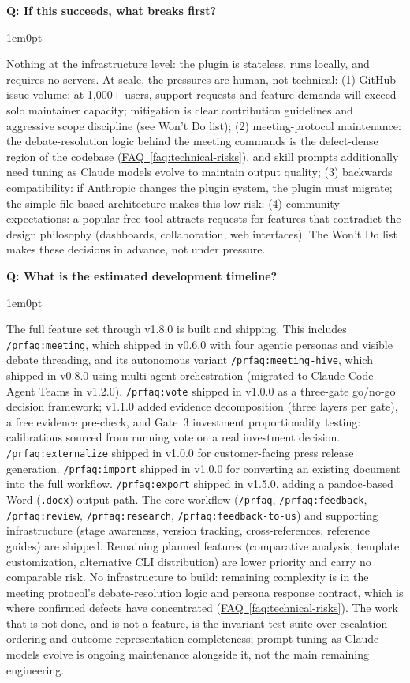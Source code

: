 \documentclass[11pt,letterpaper]{article}
\newcounter{faqnum}
\newenvironment{faqpair}[1]{%
  \needspace{4\baselineskip}%
  \vspace{0.5em}%
  \refstepcounter{faqnum}%
  \noindent\textbf{\color{SectionBlue}Q\thefaqnum: #1}\par\nopagebreak[4]%
  \vspace{0.2em}%
  \begin{adjustwidth}{1em}{0pt}%
  \setlength{\parindent}{0pt}%
}{%
  \end{adjustwidth}%
  \vspace{0.5em}%
}
\newcommand{\faqref}[1]{\hyperref[#1]{FAQ~\ref*{#1}}}
\begin{document}
\begin{faqpair}{If this succeeds, what breaks first?}
  Nothing at the infrastructure level: the plugin is stateless, runs locally, and requires no servers. At scale, the pressures are human, not technical: (1) GitHub issue volume: at 1,000+ users, support requests and feature demands will exceed solo maintainer capacity; mitigation is clear contribution guidelines and aggressive scope discipline (see Won't Do list); (2) meeting-protocol maintenance: the debate-resolution logic behind the meeting commands is the defect-dense region of the codebase (\faqref{faq:technical-risks}), and skill prompts additionally need tuning as Claude models evolve to maintain output quality; (3) backwards compatibility: if Anthropic changes the plugin system, the plugin must migrate; the simple file-based architecture makes this low-risk; (4) community expectations: a popular free tool attracts requests for features that contradict the design philosophy (dashboards, collaboration, web interfaces). The Won't Do list makes these decisions in advance, not under pressure.
\end{faqpair}

\begin{faqpair}{What is the estimated development timeline?}
  The full feature set through v1.8.0 is built and shipping. This includes \texttt{/prfaq:meeting}, which shipped in v0.6.0 with four agentic personas and visible debate threading, and its autonomous variant \texttt{/prfaq:meeting-hive}, which shipped in v0.8.0 using multi-agent orchestration (migrated to Claude Code Agent Teams in v1.2.0). \texttt{/prfaq:vote} shipped in v1.0.0 as a three-gate go/no-go decision framework; v1.1.0 added evidence decomposition (three layers per gate), a free evidence pre-check, and Gate~3 investment proportionality testing: calibrations sourced from running vote on a real investment decision. \texttt{/prfaq:externalize} shipped in v1.0.0 for customer-facing press release generation. \texttt{/prfaq:import} shipped in v1.0.0 for converting an existing document into the full workflow. \texttt{/prfaq:export} shipped in v1.5.0, adding a pandoc-based Word (\texttt{.docx}) output path. The core workflow (\texttt{/prfaq}, \texttt{/prfaq:feedback}, \texttt{/prfaq:review}, \texttt{/prfaq:research}, \texttt{/prfaq:feedback-to-us}) and supporting infrastructure (stage awareness, version tracking, cross-references, reference guides) are shipped. Remaining planned features (comparative analysis, template customization, alternative CLI distribution) are lower priority and carry no comparable risk. No infrastructure to build: remaining complexity is in the meeting protocol's debate-resolution logic and persona response contract, which is where confirmed defects have concentrated (\faqref{faq:technical-risks}). The work that is not done, and is not a feature, is the invariant test suite over escalation ordering and outcome-representation completeness; prompt tuning as Claude models evolve is ongoing maintenance alongside it, not the main remaining engineering.
\end{faqpair}
\end{document}
